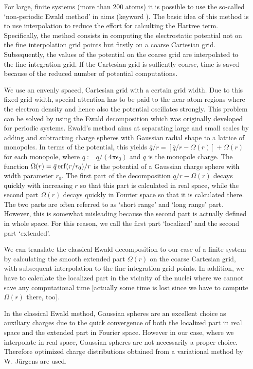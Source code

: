 For large, finite systems (more than 200 atoms) it is possible to use the
so-called `non-periodic Ewald method' in aims (keyword
). The basic idea of this method is
to use interpolation to reduce the effort for calculting the Hartree term.
Specifically, the method consists in computing the electrostatic potential not
on the fine interpolation grid points but firstly on a coarse Cartesian grid.
Subsequently, the values of the potential on the coarse grid are interpolated to
the fine integration grid. If the Cartesian grid is suffiently coarse, time is
saved because of the reduced number of potential computations.

We use an envenly spaced, Cartesian grid with a certain grid width. Due to this
fixed grid width, special attention has to be paid to the near-atom regions
where the electron density and hence also the potential oscillates strongly.
This problem can be solved by using the Ewald decomposition which was originally
developed for periodic systems. Ewald's method aims at separating large and
small scales by adding and subtracting charge spheres with Gaussian radial shape
to a lattice of monopoles. In terms of the potential, this yields $\bar{q}/r = [
  \bar{q}/r - \Omega(r) ] + \Omega(r)$ for each monopole, where $\bar{q} := q/(4
\pi \epsilon_0)$ and $q$ is the monopole charge. The function $\Omega(r) =
\bar{q}\mathop{\mathrm{erf}}(r/r_0)/r$ is the potential of a Gaussian charge sphere with width
parameter $r_0$. The first part of the decomposition $\bar{q}/r - \Omega(r)$
decays quickly with increasing $r$ so that this part is calculated in real
space, while the second part $\Omega(r)$ decays quickly in Fourier space so that
it is calculated there. The two parts are often referred to as `short range' and
`long range' part. However, this is somewhat misleading because the second part
is actually defined in whole space. For this reason, we call the first part
`localized' and the second part `extended'.

We can translate the classical Ewald decomposition to our case of a finite
system by calculating the smooth extended part $\Omega(r)$ on the coarse
Cartesian grid, with subsequent interpolation to the fine integration grid
points. In addition, we have to calculate the localized part in the vicinity of
the nuclei where we cannot save any computational time [actually some time is
lost since we have to compute $\Omega(r)$ there, too].

In the classical Ewald method, Gaussian spheres are an excellent choice as
auxiliary charges due to the quick convergence of both the localized part in
real space and the extended part in Fourier space. However in our case, where we
interpolate in real space, Gaussian spheres are not necessarily a proper choice.
Therefore optimized charge distributions obtained from a variational method by
W. J\"urgens are used.

